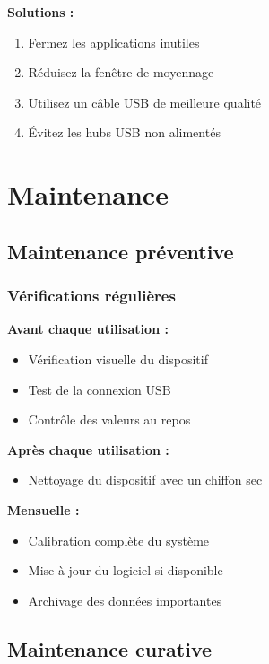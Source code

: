 \documentclass[12pt,a4paper]{article}
\begin{document}
\textbf{Solutions :}
\begin{enumerate}
    \item Fermez les applications inutiles
    \item Réduisez la fenêtre de moyennage
    \item Utilisez un câble USB de meilleure qualité
    \item Évitez les hubs USB non alimentés
\end{enumerate}

\section{Maintenance}

\subsection{Maintenance préventive}

\subsubsection{Vérifications régulières}

\textbf{Avant chaque utilisation :}
\begin{itemize}
    \item Vérification visuelle du dispositif
    \item Test de la connexion USB
    \item Contrôle des valeurs au repos
\end{itemize}

\textbf{Après chaque utilisation :}
\begin{itemize}
    \item Nettoyage du dispositif avec un chiffon sec
\end{itemize}

\textbf{Mensuelle :}
\begin{itemize}
    \item Calibration complète du système
    \item Mise à jour du logiciel si disponible
    \item Archivage des données importantes
\end{itemize}

\subsection{Maintenance curative}
\end{document}
